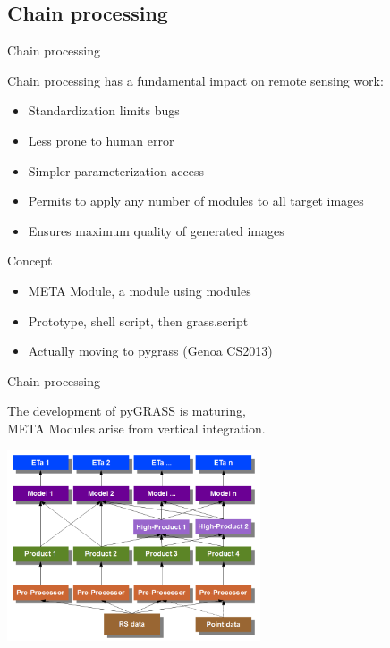 \documentclass[xcolor=dvipsnames,beamer]{beamer} %
\begin{document}
\subsection{Chain processing}
\begin{frame}[fragile]{Chain processing}

Chain processing has a fundamental impact on remote sensing work:\\

\begin{itemize}
 \item Standardization limits bugs
 \item Less prone to human error
 \item Simpler parameterization access
 \item Permits to apply any number of modules to all target images
 \item Ensures maximum quality of generated images
\end{itemize}


\begin{block}{Concept}
\begin{itemize}
 \item META Module, a module using modules
 \item Prototype, shell script, then grass.script
 \item Actually moving to pygrass (Genoa CS2013)
\end{itemize}
\end{block}

\end{frame}
\begin{frame}[fragile]{Chain processing}

The development of pyGRASS is maturing,\\
META Modules arise from vertical integration.

\begin{center}
 \includegraphics[width=7.5cm]{chain0}
\end{center}

\end{frame}
\end{document}
